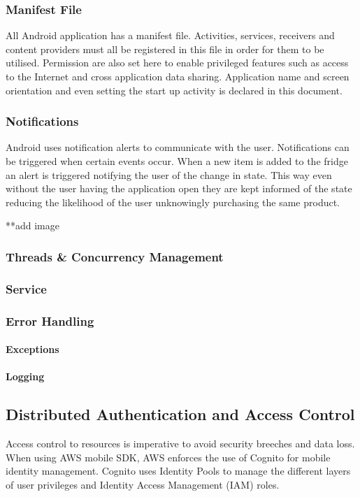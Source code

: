 \documentclass[a4paper, 11pt]{article}
\begin{document}
\subsubsection{Manifest File}
All Android application has a manifest file. Activities, services, receivers and content providers must all be registered in this file in order for them to be utilised. Permission are also set here to enable privileged features such as access to the Internet and cross application data sharing. Application name and screen orientation and even setting the start up activity is declared in this document.



\subsubsection{Notifications}
Android uses notification alerts to communicate with the user. Notifications can be triggered when certain events occur. When a new item is added to the fridge an alert is triggered notifying the user of the change in state. This way even without the user having the application open they are kept informed of the state reducing the likelihood of the user unknowingly purchasing the same product.

**add image
\subsubsection{Threads \& Concurrency Management}
\subsubsection{Service}
\subsubsection{Error Handling}
\paragraph{Exceptions}
\paragraph{Logging}


\subsection{Distributed Authentication and Access Control}

Access control to resources is imperative to avoid security breeches and data loss. When using AWS mobile SDK, AWS enforces the use of Cognito for mobile identity management. Cognito uses Identity Pools to manage the different layers of user privileges and Identity Access Management (IAM) roles.
\end{document}
